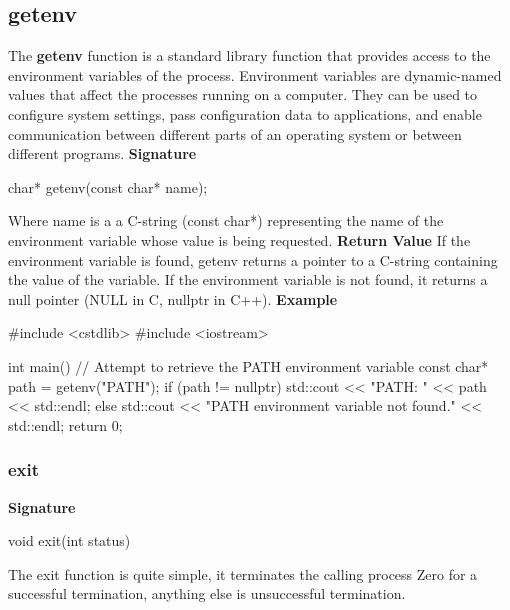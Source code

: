 \documentclass{report}
\begin{document}
    \subsection{getenv}
    \bigbreak \noindent 
    \begin{concept}
        The \textbf{getenv} function is a standard library function that provides access to the environment variables of the process. Environment variables are dynamic-named values that affect the processes running on a computer. They can be used to configure system settings, pass configuration data to applications, and enable communication between different parts of an operating system or between different programs.
        \bigbreak \noindent 
        \textbf{Signature}
        \begin{cppcode}
            char* getenv(const char* name);
        \end{cppcode}
        \bigbreak \noindent 
        Where name is a a C-string (const char*) representing the name of the environment variable whose value is being requested.
        \bigbreak \noindent 
        \textbf{Return Value}
        \bigbreak \noindent 
        If the environment variable is found, getenv returns a pointer to a C-string containing the value of the variable.
        \bigbreak \noindent 
        If the environment variable is not found, it returns a null pointer (NULL in C, nullptr in C++).
        \bigbreak \noindent 
        \textbf{Example} 
        \bigbreak \noindent 
        \begin{cppcode}
            #include <cstdlib>
            #include <iostream>

            int main() {
                // Attempt to retrieve the PATH environment variable
                const char* path = getenv("PATH");
                if (path != nullptr) {
                    std::cout << "PATH: " << path << std::endl;
                } else {
                    std::cout << "PATH environment variable not found." << std::endl;
                }
                return 0;
            }
        \end{cppcode}
    \end{concept}

    \pagebreak 
    \subsubsection{exit}
    \bigbreak \noindent 
    \textbf{Signature}
    \bigbreak \noindent 
    \begin{cppcode}
    void exit(int status)
    \end{cppcode}
    \bigbreak \noindent 
    The exit function is quite simple, it terminates the calling process
    \bigbreak \noindent 
    Zero for a successful termination, anything else is unsuccessful termination.
    \bigbreak \noindent 
\end{document}
